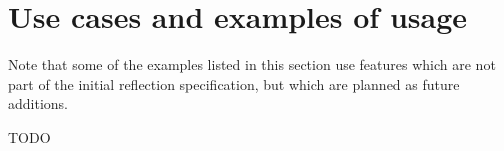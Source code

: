 \section{Use cases and examples of usage}
\label{use-cases-examples}

Note that some of the examples listed in this section use features which
are not part of the initial reflection specification, but which are planned
as future additions.







TODO
